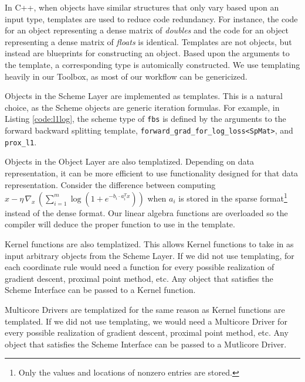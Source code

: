 In C++, when objects have similar structures that only vary based upon an input type, templates are used to reduce code redundancy. For instance, the code for an object representing a dense matrix of \emph{doubles} and the code for an object representing a dense matrix of \emph{floats} is identical.
Templates are not objects, but instead are blueprints for constructing an object.
Based upon the arguments to the template, a corresponding type is automically constructed.
We use templating heavily in our Toolbox, as most of our workflow can be genericized.

Objects in the Scheme Layer are implemented as templates.
This is a natural choice, as the Scheme objects are generic iteration formulas.
For example, in Listing \ref{code:l1log}, the scheme type of \texttt{fbs} is defined by the arguments to the forward backward splitting template, \texttt{forward\_grad\_for\_log\_loss<SpMat>}, and \texttt{prox\_l1}.

Objects in the Object Layer are also templatized. Depending on data representation, it can be more efficient to use functionality designed for that data representation. Consider the difference between computing $x - \eta \, \nabla_x \,(\sum_{i = 1}^m \log (1 + e^{-b_i \cdot a_i^T x}))$ when $a_i$ is stored in the  sparse format\footnote{Only the values and locations of  nonzero entries are stored.} instead of the dense format.
Our linear algebra functions are overloaded so the compiler will deduce the proper function to use in the template.

Kernel functions are also templatized. This allows Kernel functions to take in as input arbitrary objects from the Scheme Layer. If we did not use templating, for each coordinate rule would need a function for every possible realization of gradient descent, proximal point method, etc.  Any object that satisfies the Scheme Interface can be passed to a Kernel function.

Multicore Drivers are templatized for the same reason as Kernel functions are templated. If we did not use templating, we would need a Multicore Driver for every possible realization of gradient descent, proximal point method, etc. Any object that satisfies the Scheme Interface can be passed to a Mutlicore Driver.

